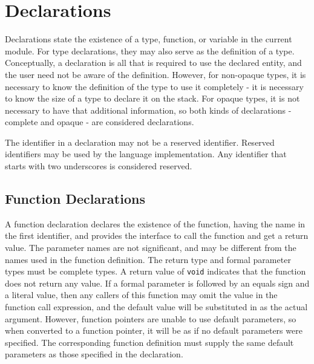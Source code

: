 \documentclass[letterpaper,12pt]{book}
\begin{document}
\chapter{Declarations}



Declarations state the existence of a type, function, or variable in the current module. For type declarations, they may also serve as the definition of a type. Conceptually, a declaration is all that is required to use the declared entity, and the user need not be aware of the definition. However, for non-opaque types, it is necessary to know the definition of the type to use it completely - it is necessary to know the size of a type to declare it on the stack. For opaque types, it is not necessary to have that additional information, so both kinds of declarations - complete and opaque - are considered declarations.

The identifier in a declaration may not be a reserved identifier. Reserved identifiers may be used by the language implementation. Any identifier that starts with two underscores is considered reserved.

\section{Function Declarations}\label{section:Function Declarations}



A function declaration declares the existence of the function, having the name in the first identifier, and provides the interface to call the function and get a return value. The parameter names are not significant, and may be different from the names used in the function definition. The return type and formal parameter types must be complete types. A return value of \texttt{void} indicates that the function does not return any value. If a formal parameter is followed by an equals sign and a literal value, then any callers of this function may omit the value in the function call expression, and the default value will be substituted in as the actual argument. However, function pointers are unable to use default parameters, so when converted to a function pointer, it will be as if no default parameters were specified. The corresponding function definition must supply the same default parameters as those specified in the declaration.
\end{document}
